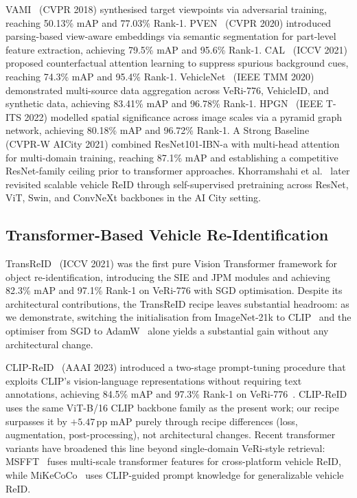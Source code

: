 \documentclass[11pt]{article}
\begin{document}
VAMI~\cite{zhou2018vami} (CVPR 2018) synthesised target viewpoints via
adversarial training, reaching 50.13\% mAP and 77.03\% Rank-1.
PVEN~\cite{meng2020pven} (CVPR 2020) introduced parsing-based view-aware
embeddings via semantic segmentation for part-level feature extraction,
achieving 79.5\% mAP and 95.6\% Rank-1.
CAL~\cite{rao2021cal} (ICCV 2021) proposed counterfactual attention learning
to suppress spurious background cues, reaching 74.3\% mAP and 95.4\% Rank-1.
VehicleNet~\cite{zheng2020vehiclenet} (IEEE TMM 2020) demonstrated multi-source
data aggregation across VeRi-776, VehicleID, and synthetic data, achieving
83.41\% mAP and 96.78\% Rank-1.
HPGN~\cite{shen2022hpgn} (IEEE T-ITS 2022) modelled spatial significance
across image scales via a pyramid graph network, achieving 80.18\% mAP and
96.72\% Rank-1.
A Strong Baseline~\cite{cybercore2021strong} (CVPR-W AICity 2021) combined
ResNet101-IBN-a with multi-head attention for multi-domain training, reaching
87.1\% mAP and establishing a competitive ResNet-family ceiling prior to
transformer approaches. Khorramshahi et al.~\cite{khorramshahi2023selfsupervision}
later revisited scalable vehicle ReID through self-supervised pretraining across
ResNet, ViT, Swin, and ConvNeXt backbones in the AI City setting.

\subsection{Transformer-Based Vehicle Re-Identification}
TransReID~\cite{he2021transreid} (ICCV 2021) was the first pure Vision
Transformer framework for object re-identification, introducing the SIE and
JPM modules and achieving 82.3\% mAP and 97.1\% Rank-1 on VeRi-776 with SGD
optimisation. Despite its architectural contributions, the TransReID recipe
leaves substantial headroom: as we demonstrate, switching the initialisation
from ImageNet-21k to CLIP~\cite{radford2021clip} and the optimiser from SGD to
AdamW~\cite{loshchilov2019adamw} alone yields a substantial gain without any
architectural change.

CLIP-ReID~\cite{li2023clipreid} (AAAI 2023) introduced a two-stage
prompt-tuning procedure that exploits CLIP's vision-language representations
without requiring text annotations, achieving 84.5\% mAP and 97.3\% Rank-1 on
VeRi-776~\cite{opencodepapers2024veri}. CLIP-ReID uses the same ViT-B/16 CLIP
backbone family as the present work; our recipe surpasses it by $+5.47$\,pp
mAP purely through recipe differences (loss, augmentation, post-processing),
not architectural changes.
Recent transformer variants have broadened this line beyond single-domain
VeRi-style retrieval: MSFFT~\cite{holla2024msfft} fuses multi-scale transformer
features for cross-platform vehicle ReID, while MiKeCoCo~\cite{kuang2025mikecoco}
uses CLIP-guided prompt knowledge for generalizable vehicle ReID.
\end{document}
